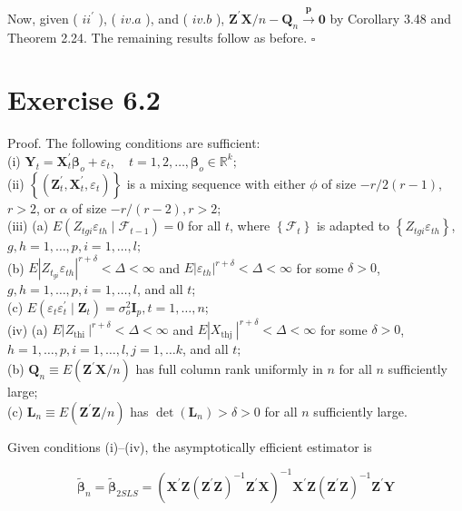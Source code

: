 \documentclass[10pt]{article}
\begin{document}
Now, given ( $i i^{\prime}$ ), ( $i v . a$ ), and ( $i v . b$ ), $\mathbf{Z}^{\prime} \mathbf{X} / n-\mathbf{Q}_{n} \xrightarrow{\boldsymbol{p}} \mathbf{0}$ by Corollary 3.48 and Theorem 2.24. The remaining results follow as before. \(\square\)

\section*{Exercise 6.2}
Proof. The following conditions are sufficient:\\
(i) $\mathbf{Y}_{t}=\mathbf{X}_{t}^{\prime} \boldsymbol{\beta}_{o}+\varepsilon_{t}, \quad t=1,2, \ldots, \boldsymbol{\beta}_{o} \in \mathbb{R}^{k} ;$\\
(ii) $\left\{\left(\mathbf{Z}_{t}^{\prime}, \mathbf{X}_{t}^{\prime}, \varepsilon_{t}\right)\right\}$ is a mixing sequence with either $\phi$ of size $-r / 2(r-1)$, $r>2$, or $\alpha$ of size $-r /(r-2), r>2$;\\
(iii) (a) $E\left(Z_{t g i} \varepsilon_{t h} \mid \mathcal{F}_{t-1}\right)=0$ for all $t$, where $\left\{\mathcal{F}_{t}\right\}$ is adapted to $\left\{Z_{t g i} \varepsilon_{t h}\right\}$, $g, h=1, \ldots, p, i=1, \ldots, l ;$\\
(b) $E\left|Z_{t_{g i}} \varepsilon_{t h}\right|^{r+\delta}<\Delta<\infty$ and $E\left|\varepsilon_{t h}\right|^{r+\delta}<\Delta<\infty$ for some $\delta>0$, $g, h=1, \ldots, p, i=1, \ldots, l$, and all $t$;\\
(c) $E\left(\varepsilon_{t} \varepsilon_{t}^{\prime} \mid \mathbf{Z}_{t}\right)=\sigma_{o}^{2} \mathbf{I}_{p}, t=1, \ldots, n$;\\
(iv) (a) $E\left|Z_{\text {thi }}\right|^{r+\delta}<\Delta<\infty$ and $E\left|X_{\text {thj }}\right|^{r+\delta}<\Delta<\infty$ for some $\delta>0$, $h=1, \ldots, p, i=1, \ldots, l, j=1, \ldots k$, and all $t ;$\\
(b) $\mathbf{Q}_{n} \equiv E\left(\mathbf{Z}^{\prime} \mathbf{X} / n\right)$ has full column rank uniformly in $n$ for all $n$ sufficiently large;\\
(c) $\mathbf{L}_{n} \equiv E\left(\mathbf{Z}^{\prime} \mathbf{Z} / n\right)$ has $\operatorname{det}\left(\mathbf{L}_{n}\right)>\delta>0$ for all $n$ sufficiently large.

Given conditions (i)--(iv), the asymptotically efficient estimator is

$$
\tilde{\boldsymbol{\beta}}_{n}=\tilde{\boldsymbol{\beta}}_{2 S L S}=\left(\mathbf{X}^{\prime} \mathbf{Z}\left(\mathbf{Z}^{\prime} \mathbf{Z}\right)^{-1} \mathbf{Z}^{\prime} \mathbf{X}\right)^{-1} \mathbf{X}^{\prime} \mathbf{Z}\left(\mathbf{Z}^{\prime} \mathbf{Z}\right)^{-1} \mathbf{Z}^{\prime} \mathbf{Y}
$$
\end{document}
